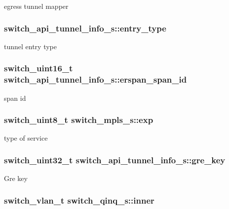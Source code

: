 egress tunnel mapper \hypertarget{group__Tunnel_ga08132f7df2f5c508bde52a738ea627fd}{
\subsubsection[{entry\+\_\+type}]{ switch\+\_\+api\+\_\+tunnel\+\_\+info\+\_\+s\+::entry\+\_\+type}}\label{group__Tunnel_ga08132f7df2f5c508bde52a738ea627fd}
tunnel entry type \hypertarget{group__Tunnel_gad06fec7740f72b2510bb540c7744792e}{
\subsubsection[{erspan\+\_\+span\+\_\+id}]{\setlength{\rightskip}{0pt plus 5cm}switch\+\_\+uint16\+\_\+t switch\+\_\+api\+\_\+tunnel\+\_\+info\+\_\+s\+::erspan\+\_\+span\+\_\+id}}\label{group__Tunnel_gad06fec7740f72b2510bb540c7744792e}
span id \hypertarget{group__Tunnel_gaa051a49261e173522f5912b8ba8d0c73}{
\subsubsection[{exp}]{\setlength{\rightskip}{0pt plus 5cm}switch\+\_\+uint8\+\_\+t switch\+\_\+mpls\+\_\+s\+::exp}}\label{group__Tunnel_gaa051a49261e173522f5912b8ba8d0c73}
type of service \hypertarget{group__Tunnel_gae83720f8c95f2c463c79af35ddda9530}{
\subsubsection[{gre\+\_\+key}]{\setlength{\rightskip}{0pt plus 5cm}switch\+\_\+uint32\+\_\+t switch\+\_\+api\+\_\+tunnel\+\_\+info\+\_\+s\+::gre\+\_\+key}}\label{group__Tunnel_gae83720f8c95f2c463c79af35ddda9530}
Gre key \hypertarget{group__Tunnel_gaf1d9443f4c5a0701ae353c0917065ab8}{
\subsubsection[{inner}]{\setlength{\rightskip}{0pt plus 5cm}switch\+\_\+vlan\+\_\+t switch\+\_\+qinq\+\_\+s\+::inner}}\label{group__Tunnel_gaf1d9443f4c5a0701ae353c0917065ab8}
